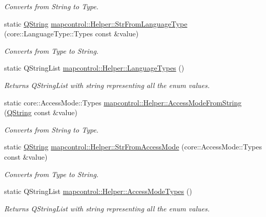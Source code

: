 \begin{DoxyCompactItemize}
\begin{DoxyCompactList}\small\item\em \-Converts from \-String to \-Type. \end{DoxyCompactList}\item 
static \hyperlink{group___u_a_v_objects_plugin_gab9d252f49c333c94a72f97ce3105a32d}{\-Q\-String} \hyperlink{group___o_p_map_widget_gaeb691bec877a44aa5e4270efaa965c2a}{mapcontrol\-::\-Helper\-::\-Str\-From\-Language\-Type} (core\-::\-Language\-Type\-::\-Types const \&value)
\begin{DoxyCompactList}\small\item\em \-Converts from \-Type to \-String. \end{DoxyCompactList}\item 
static \-Q\-String\-List \hyperlink{group___o_p_map_widget_ga28c4df400106ab046111295c18abfa28}{mapcontrol\-::\-Helper\-::\-Language\-Types} ()
\begin{DoxyCompactList}\small\item\em \-Returns \-Q\-String\-List with string representing all the enum values. \end{DoxyCompactList}\item 
static core\-::\-Access\-Mode\-::\-Types \hyperlink{group___o_p_map_widget_ga800ba0d0ba832cda15296dcc2bad12c5}{mapcontrol\-::\-Helper\-::\-Access\-Mode\-From\-String} (\hyperlink{group___u_a_v_objects_plugin_gab9d252f49c333c94a72f97ce3105a32d}{\-Q\-String} const \&value)
\begin{DoxyCompactList}\small\item\em \-Converts from \-String to \-Type. \end{DoxyCompactList}\item 
static \hyperlink{group___u_a_v_objects_plugin_gab9d252f49c333c94a72f97ce3105a32d}{\-Q\-String} \hyperlink{group___o_p_map_widget_gaff17bf5b9d2437f75977d8456ee9e737}{mapcontrol\-::\-Helper\-::\-Str\-From\-Access\-Mode} (core\-::\-Access\-Mode\-::\-Types const \&value)
\begin{DoxyCompactList}\small\item\em \-Converts from \-Type to \-String. \end{DoxyCompactList}\item 
static \-Q\-String\-List \hyperlink{group___o_p_map_widget_gacc8738b3a3d1e4f7e0f4578685d495e0}{mapcontrol\-::\-Helper\-::\-Access\-Mode\-Types} ()
\begin{DoxyCompactList}\small\item\em \-Returns \-Q\-String\-List with string representing all the enum values. \end{DoxyCompactList}\item 

\end{DoxyCompactItemize}
